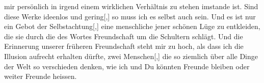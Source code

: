 \begin{ledgroupsized}[t]{13cm}
               mir persönlich in irgend einem wirklichen Verhältnis zu stehen imstande {\pb}ist. Sind diese Werke ideenlos und
                  gering{[},{]} so muss ich es selbst auch sein. Und es ist nur ein
               Gebot der Selbstachtung{[},{]} eine menschliche \label{T_L03520-5v}\label{T_L03520-5h} jener
               schönen Lüge zu entkleiden, die sie durch die \label{T_L03520-6v}\label{T_L03520-6h} des  Wortes Freundschaft um die Schultern schlägt. Und die Erinnerung
               unserer früheren Freundschaft steht mir zu hoch, als dass ich die Illusion aufrecht
               erhalten dürfte, zwei Menschen{[},{]} die so ziemlich über alle Dinge
               der Welt so verschieden denken, wie ich und Du könnten Freunde bleiben oder weiter
               Freunde heissen.\pend
           
         
         \endnumbering{}\end{ledgroupsized}  \newcommand{\dateiname}{L03520}\newcommand{\titel}{Arthur Schnitzler an Paul Goldmann, nicht abgesandt, 28. 1. 1907}\newcommand{\editorInnen}{Martin Anton Müller und Laura Untner}
      